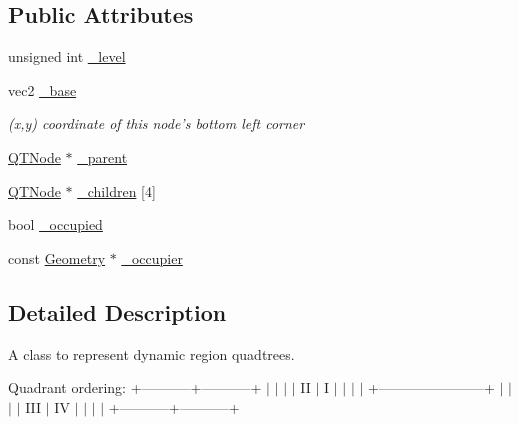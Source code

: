\subsection*{Public Attributes}
\begin{DoxyCompactItemize}
\item 
unsigned int \hyperlink{class_q_t_node_a80d41a086f3020f670732d0c7971afb0}{\+\_\+level}
\item 
vec2 \hyperlink{class_q_t_node_a363a5d722a667387d637aa5dc1c7789d}{\+\_\+base}
\begin{DoxyCompactList}\small\item\em (x,y) coordinate of this node's bottom left corner \end{DoxyCompactList}\item 
\hyperlink{class_q_t_node}{Q\+T\+Node} $\ast$ \hyperlink{class_q_t_node_a47f01353c3e4f66ab1006a7dbc2be797}{\+\_\+parent}
\item 
\hyperlink{class_q_t_node}{Q\+T\+Node} $\ast$ \hyperlink{class_q_t_node_ab908d2ab924e7e53f2a1d0d8373833d2}{\+\_\+children} \mbox{[}4\mbox{]}
\item 
bool \hyperlink{class_q_t_node_ae8721982666788f10f11d4545a77bf61}{\+\_\+occupied}
\item 
const \hyperlink{class_geometry}{Geometry} $\ast$ \hyperlink{class_q_t_node_aa61ac86e1264835162e6101d70b7883e}{\+\_\+occupier}
\end{DoxyCompactItemize}


\subsection{Detailed Description}
A class to represent dynamic region quadtrees.

Quadrant ordering\+: +–––––––+–––––––+ $\vert$ $\vert$ $\vert$ $\vert$ I\+I $\vert$ I $\vert$ $\vert$ $\vert$ $\vert$ +–––––––––––––––+ $\vert$ $\vert$ $\vert$ $\vert$ I\+I\+I $\vert$ I\+V $\vert$ $\vert$ $\vert$ $\vert$ +–––––––+–––––––+ 

